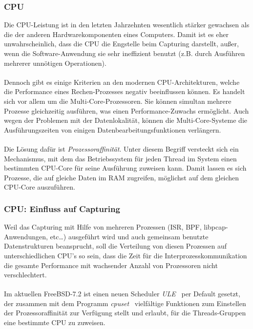 {\subsubsection{CPU}\label{sec:cpu}
Die CPU-Leistung ist in den letzten Jahrzehnten wesentlich stärker
gewachsen als die der anderen Hardwarekomponenten eines Computers. 
Damit ist es eher unwahrscheinlich, dass die CPU die
Engstelle beim Capturing darstellt, außer, wenn die 
Software-Anwendung sie sehr ineffizient
benutzt (z.B. durch Ausführen mehrerer unnötigen Operationen).\\\\
%
Dennoch gibt es einige Kriterien an den modernen CPU-Architekturen, welche die
Performance eines Rechen-Prozesses negativ beeinflussen können. Es handelt sich
vor allem um die Multi-Core-Prozessoren. Sie können simultan mehrere Prozesse
gleichzeitig ausführen, was einen Performance-Zuwachs ermöglicht. Auch
wegen der Problemen mit der Datenlokalität, können die Multi-Core-Systeme die
Ausführungszeiten von einigen Datenbearbeitungsfunktionen verlängern.\\\\
%
Die Lösung dafür ist \emph{Prozessoraffinität}. Unter diesem Begriff versteckt
sich ein Mechanismus, mit dem das Betriebssystem für jeden Thread im System einen 
bestimmten CPU-Core für seine Ausführung zuweisen kann. Damit lassen es sich 
Prozesse, die auf gleiche Daten im RAM zugreifen, möglichst auf dem gleichen 
CPU-Core auszuführen.
%
\subsubsection*{CPU: Einfluss auf  Capturing}\label{sec:cpu_einfl_auf_cap}
Weil das Capturing mit Hilfe von mehreren Prozessen (ISR, BPF,
libpcap-Anwendungen, etc\ldots) ausgeführt wird und auch gemeinsam
benutzte Datenstrukturen beansprucht, soll die Verteilung von diesen Prozessen
auf unterschiedlichen CPU's so sein, dass die Zeit für die
Interprozesskommunikation die gesamte Performance mit wachsender Anzahl 
von Prozessoren nicht verschlechtert.\\\\
%
Im aktuellen FreeBSD-7.2 ist einen neuen Scheduler \emph{ULE}~\cite{bsd_ule} per
Default gesetzt, der zusammen mit dem Programm \emph{cpuset}~\cite{man_cpuset}
vielfältige Funktionen zum Einstellen der Prozessoraffinität zur Verfügung stellt und
erlaubt, für die Threads-Gruppen eine bestimmte CPU zu zuweisen.

}
